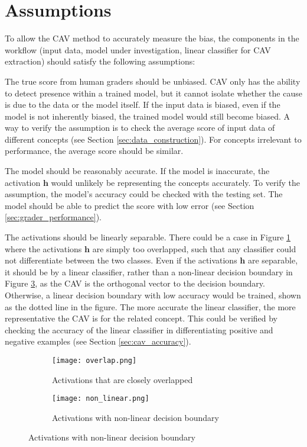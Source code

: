 \section{Assumptions}
To allow the CAV method to accurately measure the bias, the components in the workflow (input data, model under investigation, linear classifier for CAV extraction) should satisfy the following assumptions:

The true score from human graders should be unbiased. CAV only has the ability to detect presence within a trained model, but it cannot isolate whether the cause is due to the data or the model itself. If the input data is biased, even if the model is not inherently biased, the trained model would still become biased. A way to verify the assumption is to check the average score of input data of different concepts (see Section \ref{sec:data_construction}). For concepts irrelevant to performance, the average score should be similar.

The model should be reasonably accurate. If the model is inaccurate, the activation $\boldsymbol{h}$ would unlikely be representing the concepts accurately. To verify the assumption, the model's accuracy could be checked with the testing set. The model should be able to predict the score with low error (see Section \ref{sec:grader_performance}).

The activations should be linearly separable. There could be a case in Figure \ref{fig:overlap} where the activations $\boldsymbol{h}$ are simply too overlapped, such that any classifier could not differentiate between the two classes. Even if the activations $\boldsymbol{h}$ are separable, it should be by a linear classifier, rather than a non-linear decision boundary in Figure \ref{fig:non_linear}, as the CAV is the orthogonal vector to the decision boundary. Otherwise, a linear decision boundary with low accuracy would be trained, shown as the dotted line in the figure. The more accurate the linear classifier, the more representative the CAV is for the related concept. This could be verified by checking the accuracy of the linear classifier in differentiating positive and negative examples (see Section \ref{sec:cav_accuracy}).


\begin{figure}[H]
    \centering
    \begin{subfigure}{0.48\textwidth}
        \centering
        \texttt{[image: overlap.png]}
        \caption{Activations that are closely overlapped}
        \label{fig:overlap}
    \end{subfigure}
    \hfill
    \begin{subfigure}{0.48\textwidth}
        \centering
        \texttt{[image: non\_linear.png]}
        \caption{Activations with non-linear decision boundary}
        \label{fig:non_linear}
    \end{subfigure}
\end{figure}


